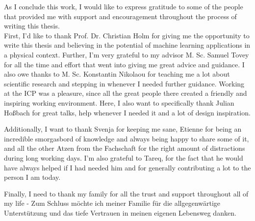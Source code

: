 As I conclude this work, I would like to express gratitude to some of the people that provided me with support and encouragement throughout the process of writing this thesis.\\
First, I'd like to thank Prof. Dr. Christian Holm for giving me the opportunity to write this thesis and believing in the potential of machine learning applications in a physical context. Further, I'm very grateful to my advisor M. Sc. Samuel Tovey for all the time and effort that went into giving me great advice and guidance. I also owe thanks to M. Sc. Konstantin Nikolaou for teaching me a lot about scientific research and stepping in whenever I needed further guidance. Working at the ICP was a pleasure, since all the great people there created a friendly and inspiring working environment. Here, I also want to specifically thank Julian Ho\ss bach for great talks, help whenever I needed it and a lot of design inspiration.\\\par
Additionally, I want to thank Svenja for keeping me sane, Etienne for being an incredible smorgasbord of knowledge and always being happy to share some of it, and all the other Atzen from the Fachschaft for the right amount of distractions during long working days. I'm also grateful to Tareq, for the fact that he would have always helped if I had needed him and for generally contributing a lot to the person I am today.\\\par
Finally, I need to thank my family for all the trust and support throughout all of my life - Zum Schluss möchte ich meiner Familie für die allgegenwärtige Unterstützung und das tiefe Vertrauen in meinen eigenen Lebensweg danken.
